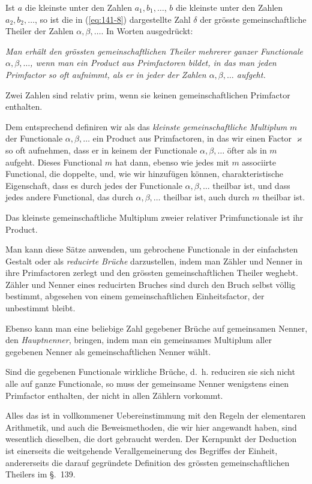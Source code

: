 \documentclass[12pt,a4paper]{article}
\theoremstyle{definition}
\begin{document}
Ist $a$ die kleinste unter den Zahlen $a_1,b_1,\dots$, $b$ die kleinste unter den Zahlen $a_2,b_2,\dots$, so ist die in (\ref{eq:141-8}) dargestellte Zahl $\delta$ der grösste gemeinschaftliche Theiler der Zahlen $\alpha,\beta,\dots$. In Worten ausgedrückt:

\medskip
\textit{Man erhält den grössten gemeinschaftlichen Theiler mehrerer ganzer Functionale $\alpha,\beta,\dots$, wenn man ein Product aus Primfactoren bildet, in das man jeden Primfactor so oft aufnimmt, als er in jeder der Zahlen $\alpha,\beta,\dots$ aufgeht.}
\medskip

Zwei Zahlen sind relativ prim, wenn sie keinen gemeinschaftlichen Primfactor enthalten.

Dem entsprechend definiren wir als das \emph{kleinste gemeinschaftliche Multiplum} $m$ der Functionale $\alpha,\beta,\dots$ ein Product aus Primfactoren, in das wir einen Factor $\varkappa$ so oft aufnehmen, dass er in keinem der Functionale $\alpha,\beta,\dots$ öfter als in $m$ aufgeht. Dieses Functional $m$ hat dann, ebenso wie jedes mit $m$ associirte Functional, die doppelte, und, wie wir hinzufügen können, charakteristische Eigenschaft, dass es durch jedes der Functionale $\alpha,\beta,\dots$ theilbar ist, und dass jedes andere Functional, das durch $\alpha,\beta,\dots$ theilbar ist, auch durch $m$ theilbar ist.

Das kleinste gemeinschaftliche Multiplum zweier relativer Primfunctionale ist ihr Product.

Man kann diese Sätze anwenden, um gebrochene Functionale in der einfachsten Gestalt oder als \emph{reducirte Brüche} darzustellen, indem man Zähler und Nenner in ihre Primfactoren zerlegt und den grössten gemeinschaftlichen Theiler weghebt. Zähler und Nenner eines reducirten Bruches sind durch den Bruch selbst völlig bestimmt, abgesehen von einem gemeinschaftlichen Einheitsfactor, der unbestimmt bleibt.

Ebenso kann man eine beliebige Zahl gegebener Brüche auf gemeinsamen Nenner, den \emph{Hauptnenner}, bringen, indem man ein gemeinsames Multiplum aller gegebenen Nenner als gemeinschaftlichen Nenner wählt.

Sind die gegebenen Functionale wirkliche Brüche, d.~h. reduciren sie sich nicht alle auf ganze Functionale, so muss der gemeinsame Nenner wenigstens einen Primfactor enthalten, der nicht in allen Zählern vorkommt.

Alles das ist in vollkommener Uebereinstimmung mit den Regeln der elementaren Arithmetik, und auch die Beweismethoden, die wir hier angewandt haben, sind wesentlich dieselben, die dort gebraucht werden. Der Kernpunkt der Deduction ist einerseits die weitgehende Verallgemeinerung des Begriffes der Einheit, andererseits die darauf gegründete Definition des grössten gemeinschaftlichen Theilers im \S.~139.
\end{document}
